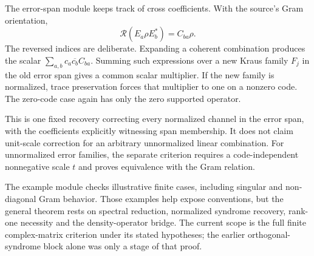 The error-span module keeps track of cross coefficients. With the source's Gram orientation,
\[
\mathcal R(E_a\rho E_b^*)=C_{ba}\rho.
\]
The reversed indices are deliberate. Expanding a coherent combination produces the scalar $\sum_{a,b}c_a\overline{c_b}C_{ba}$. Summing such expressions over a new Kraus family $F_j$ in the old error span gives a common scalar multiplier. If the new family is normalized, trace preservation forces that multiplier to one on a nonzero code. The zero-code case again has only the zero supported operator.


This is one fixed recovery correcting every normalized channel in the error span, with the coefficients explicitly witnessing span membership. It does not claim unit-scale correction for an arbitrary unnormalized linear combination. For unnormalized error families, the separate criterion requires a code-independent nonnegative scale $t$ and proves equivalence with the Gram relation.


The example module checks illustrative finite cases, including singular and non-diagonal Gram behavior. Those examples help expose conventions, but the general theorem rests on spectral reduction, normalized syndrome recovery, rank-one necessity and the density-operator bridge. The current scope is the full finite complex-matrix criterion under its stated hypotheses; the earlier orthogonal-syndrome block alone was only a stage of that proof.
